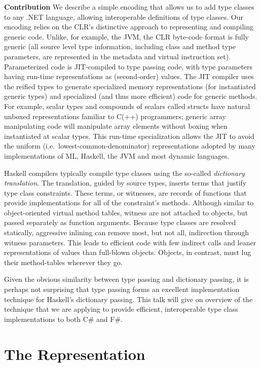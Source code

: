 \documentclass[preprint]{sig-alternate-05-2015}
\begin{document}
{\bf Contribution} We describe a simple encoding that allows us to add type classes to
any .NET language, allowing interoperable definitions of type
classes. Our encoding relies on the CLR's distinctive approach to
representing and compiling generic code\cite{genericspldi,genericspopl}. Unlike, for example, the JVM, the CLR
byte-code format is fully generic (all source level type information,
including class and method type parameters, are represented in the
metadata and virtual instruction set).  Parameterized code is JIT-compiled to type passing code,
with type parameters having run-time representations as (second-order)
values.  The JIT compiler uses the reified types to generate
specialized memory representations (for instantiated generic types)
and specialized (and thus more efficient) code for generic
methods. For example, scalar types and compounds of scalars called
structs have natural unboxed representations familiar to C(++)
programmers; generic array manipulating code will manipulate array
elements without boxing when instantiated at scalar types.  This run-time
specialization allows the JIT to avoid the uniform (i.e.\ lowest-common-denominator) representations adopted by many implementations of ML, 
Haskell, the JVM and most dynamic languages.

Haskell compilers typically compile type classes using the so-called
\emph{dictionary translation}.  The translation, guided by source
types, inserts terms that justify type class constraints. These terms,
or witnesses, are records of functions that provide implementations
for all of the constraint's methods. Although similar to
object-oriented virtual method tables, witness are not attached to
objects, but passed separately as function arguments.  Because type
classes are resolved statically, aggressive inlining can remove most,
but not all, indirection through witness parameters. This leads to
efficient code with few indirect calls and leaner representations of values than full-blown objects. Objects, in contrast, must lug their method-tables wherever they go.

Given the obvious similarity between type passing and dictionary
passing, it is perhaps not surprising that type passing forms an
excellent implementation technique for Haskell's dictionary passing. 
This talk will give on overview of the technique that we are applying to provide
efficient, interoperable type class implementations to both C\# and F\#.


\section{The Representation}
\end{document}
